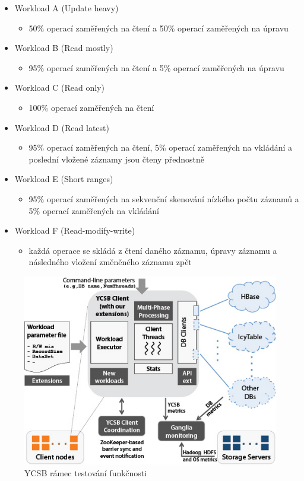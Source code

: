 \documentclass[czech,master,dept460,male,csharp,cpdeclaration]{diploma}
\begin{document}
	\begin{itemize} \label{lab-workloads}
		\item Workload A (Update heavy)
		\begin{itemize}
			\item 50\% operací zaměřených na čtení a 50\% operací zaměřených na úpravu
		\end{itemize}
		\item Workload B (Read mostly)
		\begin{itemize}
			\item 95\% operací zaměřených na čtení a 5\% operací zaměřených na úpravu
		\end{itemize}
		\item Workload C (Read only)
		\begin{itemize}
			\item 100\% operací zaměřených na čtení
		\end{itemize}
		\item Workload D (Read latest)
		\begin{itemize}
			\item 95\% operací zaměřených na čtení, 5\% operací zaměřených na vkládání a poslední vložené záznamy jsou čteny přednostně
		\end{itemize}
		\item Workload E (Short ranges)
		\begin{itemize}
			\item 95\% operací zaměřených na sekvenční skenování nízkého počtu záznamů a 5\% operací zaměřených na vkládání
		\end{itemize}
		\item Workload F (Read-modify-write)
		\begin{itemize}
			\item každá operace se skládá z čtení daného záznamu, úpravy záznamu a následného vložení změněného záznamu zpět
		\end{itemize}
	\end{itemize}

	\begin{figure}
		\centering
		\includegraphics[scale=0.7]{Data/ycsb-1.jpg}
		\caption{YCSB rámec testování funkčnosti \cite{ycsb-parallel-data-lab}\label{ycsb-blok-schema}}
	\end{figure}
\end{document}
